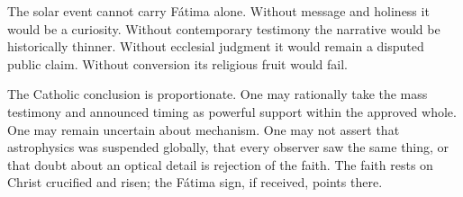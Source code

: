 The solar event cannot carry Fátima alone. Without message and holiness it would be a curiosity. Without contemporary testimony the narrative would be historically thinner. Without ecclesial judgment it would remain a disputed public claim. Without conversion its religious fruit would fail.

The Catholic conclusion is proportionate. One may rationally take the mass testimony and announced timing as powerful support within the approved whole. One may remain uncertain about mechanism. One may not assert that astrophysics was suspended globally, that every observer saw the same thing, or that doubt about an optical detail is rejection of the faith. The faith rests on Christ crucified and risen; the Fátima sign, if received, points there.
